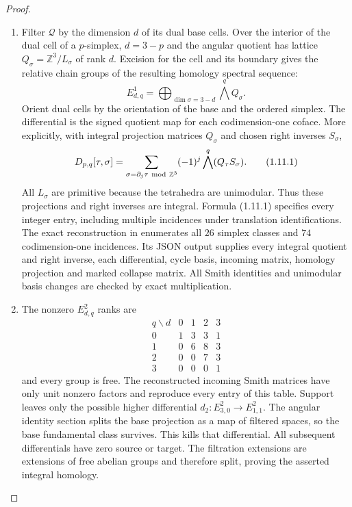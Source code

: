\begin{proof}
\begin{enumerate}[label=\arabic*.]
\item Filter $\mathcal Q$ by the dimension $d$ of its dual base cells.
Over the interior of the dual cell of a $p$-simplex, $d=3-p$ and the
angular quotient has lattice
$Q_\sigma=\mathbb Z^3/L_\sigma$ of rank $d$.
Excision for the cell and its boundary gives the relative chain
groups of the resulting homology spectral sequence:
\[
E^1_{d,q}=\bigoplus_{\dim\sigma=3-d}\bigwedge^qQ_\sigma.
\]
Orient dual cells by the orientation of the base and the ordered
simplex.  The differential is the signed quotient map for each
codimension-one coface.  More explicitly, with integral projection
matrices $Q_\sigma$ and chosen right inverses $S_\sigma$,
\[
D_{p,q}[\tau,\sigma]=
 \sum_{\sigma=\partial_j\tau\ {\rm mod}\ \mathbb Z^3}
 (-1)^j\bigwedge^q(Q_\tau S_\sigma).
\tag{1.11.1}
\]
All $L_\sigma$ are primitive because the tetrahedra are unimodular.
Thus these projections and right inverses are integral.  Formula
(1.11.1) specifies every integer entry, including multiple incidences
under translation identifications.  The exact reconstruction in
 enumerates all $26$ simplex classes and
$74$ codimension-one incidences. Its JSON output supplies every integral
quotient and right inverse, each differential, cycle basis, incoming
matrix, homology projection and marked collapse matrix. All Smith
identities and unimodular basis changes are checked by exact multiplication.

\item The nonzero $E^2_{d,q}$ ranks are
\[
\begin{array}{c|rrrr}
q\backslash d&0&1&2&3\\\hline
0&1&3&3&1\\
1&0&6&8&3\\
2&0&0&7&3\\
3&0&0&0&1
\end{array}
\]
and every group is free. The reconstructed incoming Smith matrices
have only unit nonzero factors and reproduce every entry of this table.
Support leaves only the possible higher differential
$d_2:E^2_{3,0}\to E^2_{1,1}$.
The angular identity section splits the base projection as a map of
filtered spaces, so the base fundamental class survives.  This kills
that differential.  All subsequent differentials have zero source or
target.  The filtration extensions are extensions of free abelian
groups and therefore split, proving the asserted integral homology.


\end{enumerate}
\end{proof}

